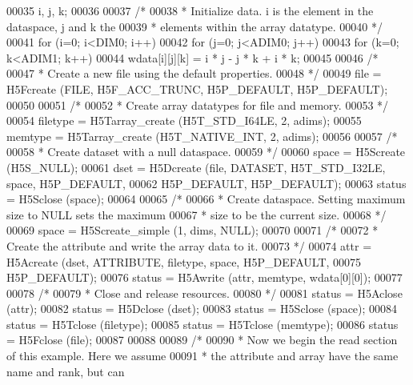 \begin{DoxyCode}
00035                 i, j, k;
00036 
00037     \textcolor{comment}{/*}
00038 \textcolor{comment}{     * Initialize data.  i is the element in the dataspace, j and k the}
00039 \textcolor{comment}{     * elements within the array datatype.}
00040 \textcolor{comment}{     */}
00041     \textcolor{keywordflow}{for} (i=0; i<DIM0; i++)
00042         \textcolor{keywordflow}{for} (j=0; j<ADIM0; j++)
00043             \textcolor{keywordflow}{for} (k=0; k<ADIM1; k++)
00044                 wdata[i][j][k] = i * j - j * k + i * k;
00045 
00046     \textcolor{comment}{/*}
00047 \textcolor{comment}{     * Create a new file using the default properties.}
00048 \textcolor{comment}{     */}
00049     file = H5Fcreate (FILE, H5F\_ACC\_TRUNC, H5P\_DEFAULT, H5P\_DEFAULT);
00050 
00051     \textcolor{comment}{/*}
00052 \textcolor{comment}{     * Create array datatypes for file and memory.}
00053 \textcolor{comment}{     */}
00054     filetype = H5Tarray\_create (H5T\_STD\_I64LE, 2, adims);
00055     memtype = H5Tarray\_create (H5T\_NATIVE\_INT, 2, adims);
00056 
00057     \textcolor{comment}{/*}
00058 \textcolor{comment}{     * Create dataset with a null dataspace.}
00059 \textcolor{comment}{     */}
00060     space = H5Screate (H5S\_NULL);
00061     dset = H5Dcreate (file, DATASET, H5T\_STD\_I32LE, space, H5P\_DEFAULT,
00062                 H5P\_DEFAULT, H5P\_DEFAULT);
00063     status = H5Sclose (space);
00064 
00065     \textcolor{comment}{/*}
00066 \textcolor{comment}{     * Create dataspace.  Setting maximum size to NULL sets the maximum}
00067 \textcolor{comment}{     * size to be the current size.}
00068 \textcolor{comment}{     */}
00069     space = H5Screate\_simple (1, dims, NULL);
00070 
00071     \textcolor{comment}{/*}
00072 \textcolor{comment}{     * Create the attribute and write the array data to it.}
00073 \textcolor{comment}{     */}
00074     attr = H5Acreate (dset, ATTRIBUTE, filetype, space, H5P\_DEFAULT,
00075                 H5P\_DEFAULT);
00076     status = H5Awrite (attr, memtype, wdata[0][0]);
00077 
00078     \textcolor{comment}{/*}
00079 \textcolor{comment}{     * Close and release resources.}
00080 \textcolor{comment}{     */}
00081     status = H5Aclose (attr);
00082     status = H5Dclose (dset);
00083     status = H5Sclose (space);
00084     status = H5Tclose (filetype);
00085     status = H5Tclose (memtype);
00086     status = H5Fclose (file);
00087 
00088 
00089     \textcolor{comment}{/*}
00090 \textcolor{comment}{     * Now we begin the read section of this example.  Here we assume}
00091 \textcolor{comment}{     * the attribute and array have the same name and rank, but can}

\end{DoxyCode}
